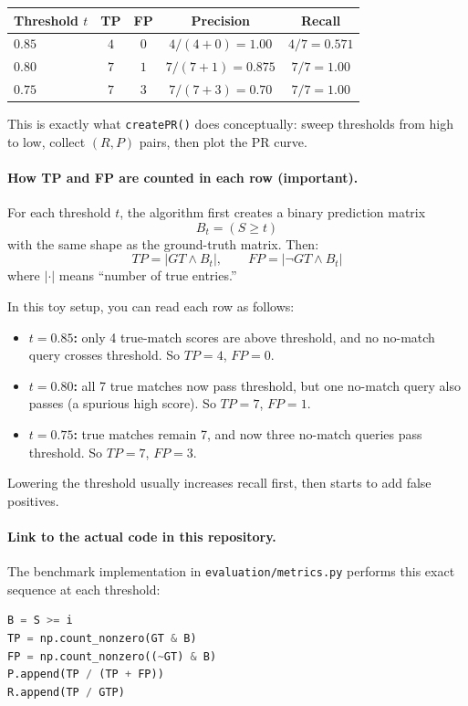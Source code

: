 \documentclass[11pt]{article}
\newcommand{\file}[1]{\texttt{#1}}
\begin{document}
\begin{longtable}{l c c c c}
\toprule
\textbf{Threshold $t$} & \textbf{TP} & \textbf{FP} & \textbf{Precision} & \textbf{Recall} \\
\midrule
$0.85$ & $4$ & $0$ & $4/(4+0)=1.00$ & $4/7=0.571$ \\
$0.80$ & $7$ & $1$ & $7/(7+1)=0.875$ & $7/7=1.00$ \\
$0.75$ & $7$ & $3$ & $7/(7+3)=0.70$ & $7/7=1.00$ \\
\bottomrule
\end{longtable}

This is exactly what \file{createPR()} does conceptually: sweep thresholds from high to low, collect $(R,P)$ pairs, then plot the PR curve.

\paragraph{How TP and FP are counted in each row (important).}
For each threshold $t$, the algorithm first creates a binary prediction matrix
$$
B_t = (S \ge t)
$$
with the same shape as the ground-truth matrix. Then:
$$
TP = |GT \land B_t|, \qquad FP = |\neg GT \land B_t|
$$
where $|\cdot|$ means ``number of true entries.''

In this toy setup, you can read each row as follows:
\begin{itemize}[leftmargin=*]
  \item \textbf{$t=0.85$:} only 4 true-match scores are above threshold, and no no-match query crosses threshold. So $TP=4$, $FP=0$.
  \item \textbf{$t=0.80$:} all 7 true matches now pass threshold, but one no-match query also passes (a spurious high score). So $TP=7$, $FP=1$.
  \item \textbf{$t=0.75$:} true matches remain 7, and now three no-match queries pass threshold. So $TP=7$, $FP=3$.
\end{itemize}

Lowering the threshold usually increases recall first, then starts to add false positives.

\paragraph{Link to the actual code in this repository.}
The benchmark implementation in \file{evaluation/metrics.py} performs this exact sequence at each threshold:
\begin{lstlisting}[style=repo, language=Python, caption={Per-threshold counting logic used in createPR()}]
B = S >= i
TP = np.count_nonzero(GT & B)
FP = np.count_nonzero((~GT) & B)
P.append(TP / (TP + FP))
R.append(TP / GTP)
\end{lstlisting}
\end{document}
